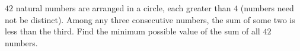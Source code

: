 $42$ natural numbers are arranged in a circle, each greater than $4$ (numbers need not be distinct). Among any three consecutive numbers, the sum of some two is less than the third. Find the minimum possible value of the sum of all $42$ numbers.
